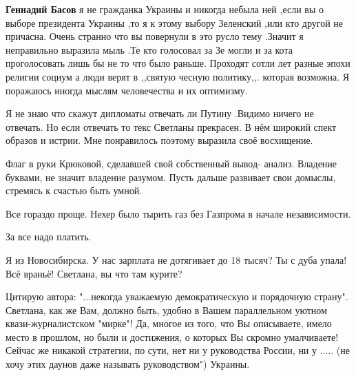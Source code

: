 \begin{itemize}
\begin{itemize}
\textbf{Геннадий Басов} я не гражданка Украины и никогда небыла ней ,если вы о выборе
президента Украины ,то я к этому выбору Зеленский ,или кто другой не
причасна. Очень странно что вы повернули в это русло тему .Значит я неправильно
выразила мыль .Те кто голосовал за Зе могли и за кота проголосовать лишь бы не
то что было раньше. Проходят сотли лет разные эпохи религии социум а люди верят
в ,,святую чесную политику,,. которая возможна. Я поражаюсь иногда мыслям
человечества и их оптимизму.

Я не знаю что скажут дипломаты отвечать ли Путину .Видимо ничего не отвечать. Но
если отвечать то текс Светланы прекрасен. В нём широкий спект образов и
истрии. Мне понравилось поэтому выразила своё восхищение.
\end{itemize}

 

Флаг в руки Крюковой, сделавшей свой собственный вывод- анализ. Владение
буквами, не значит владение разумом. Пусть дальше развивает свои домыслы,
стремясь к счастью быть умной.


Все гораздо проще. Нехер было тырить газ без Газпрома в начале независимости.

За все надо платить.

 
Я из Новосибирска. У нас зарплата не дотягивает до 18 тысяч? Ты с дуба упала! Всё враньё! Светлана, вы что там курите?

 

Цитирую автора: "...некогда уважаемую демократическую и порядочную страну".
Светлана, как же Вам, должно быть, удобно в Вашем параллельном уютном
квази-журналистском "мирке"! Да, многое из того, что Вы описываете, имело место
в прошлом, но были и достижения, о которых Вы скромно умалчиваете! Сейчас же
никакой стратегии, по сути, нет ни у руководства России, ни у ..... (не хочу
этих даунов даже называть руководством") Украины. 


\end{itemize}
